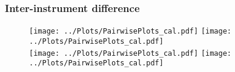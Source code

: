 \documentclass[10pt,dvipsnames,table]{beamer}
\begin{document}
\begin{frame}
\frametitle{Inter-instrument difference}
\vspace{-0.3cm}
\begin{center}
\begin{figure}
\texttt{[image: ../Plots/PairwisePlots\_cal.pdf]} \hspace{1cm}
\texttt{[image: ../Plots/PairwisePlots\_cal.pdf]} \\
\texttt{[image: ../Plots/PairwisePlots\_cal.pdf]} \hspace{1cm}
\texttt{[image: ../Plots/PairwisePlots\_cal.pdf]}
\end{figure}
\end{center}
\end{frame}
\end{document}
